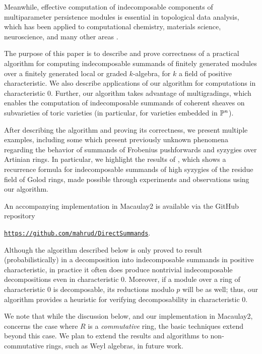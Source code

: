 \documentclass[12pt]{article}
\numberwithin{equation}{section}
\theoremstyle{theorem}
\numberwithin{thm}{section}
\theoremstyle{definition}
\begin{document}
Meanwhile, effective computation of indecomposable components of multiparameter persistence modules is essential in topological data analysis, which has been applied to computational chemistry, materials science, neuroscience, and many other areas \cite{BL23}.

The purpose of this paper is to describe and prove correctness of a practical algorithm for computing indecomposable summands of finitely generated modules over a finitely generated local or graded $k$-algebra, for $k$ a field of positive characteristic. We also describe applications of our algorithm for computations in characteristic 0. Further, our algorithm takes advantage of multigradings, which enables the computation of indecomposable summands of coherent sheaves on subvarieties of toric varieties (in particular, for varieties embedded in $\P^n$).

After describing the algorithm and proving its correctness, we present multiple examples, including some which present previously unknown phenomena regarding the behavior of summands of Frobenius pushforwards and syzygies over Artinian rings. In particular, we highlight the results of \cite{CDE24}, which shows a recurrence formula for indecomposable summands of high syzygies of the residue field of Golod rings, made possible through experiments and observations using our algorithm.

An accompanying implementation in Macaulay2 \cite{M2} is available via the GitHub repository \\
\centerline{
  \href{https://github.com/mahrud/DirectSummands}
  {\texttt{https://github.com/mahrud/DirectSummands}}.}


\begin{rem}
Although the algorithm described below is only proved to result (probabilistically) in a decomposition into indecomposable summands in positive characteristic, in practice it often does produce nontrivial indecomposable decompositions even in characteristic 0. Moreover, if a module over a ring of characteristic 0 is decomposable, its reductions modulo $p$ will be as well; thus, our algorithm provides a heuristic for verifying decomposability in characteristic 0.

  We note that while the discussion below, and our implementation in Macaulay2, concerns the case where $R$ is a \emph{commutative} ring, the basic techniques extend beyond this case. We plan to extend the results and algorithms to non-commutative rings, such as Weyl algebras, in future work.
\end{rem}
\end{document}
